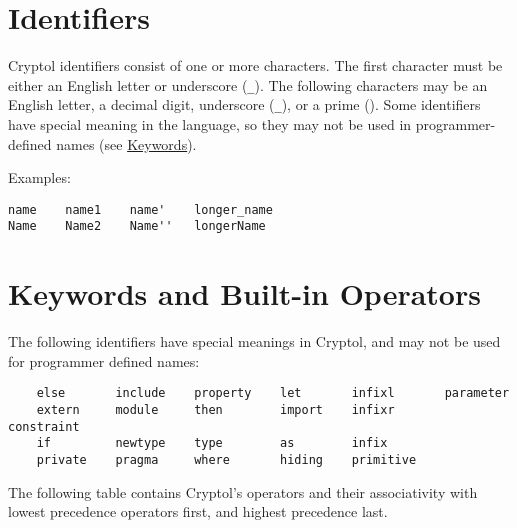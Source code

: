 \section{Identifiers}\label{identifiers}

Cryptol identifiers consist of one or more characters. The first
character must be either an English letter or underscore (\texttt{\_}).
The following characters may be an English letter, a decimal digit,
underscore (\texttt{\_}), or a prime (\texttt{\textquotesingle{}}). Some
identifiers have special meaning in the language, so they may not be
used in programmer-defined names (see
\protect\hyperlink{keywords-and-built-in-operators}{Keywords}).

Examples:

\begin{verbatim}
name    name1    name'    longer_name
Name    Name2    Name''   longerName
\end{verbatim}

\hypertarget{keywords-and-built-in-operators}{\section{Keywords and
Built-in Operators}\label{keywords-and-built-in-operators}}

The following identifiers have special meanings in Cryptol, and may not
be used for programmer defined names:

\begin{verbatim}
    else       include    property    let       infixl       parameter
    extern     module     then        import    infixr       constraint
    if         newtype    type        as        infix
    private    pragma     where       hiding    primitive
\end{verbatim}

The following table contains Cryptol's operators and their associativity
with lowest precedence operators first, and highest precedence last.

